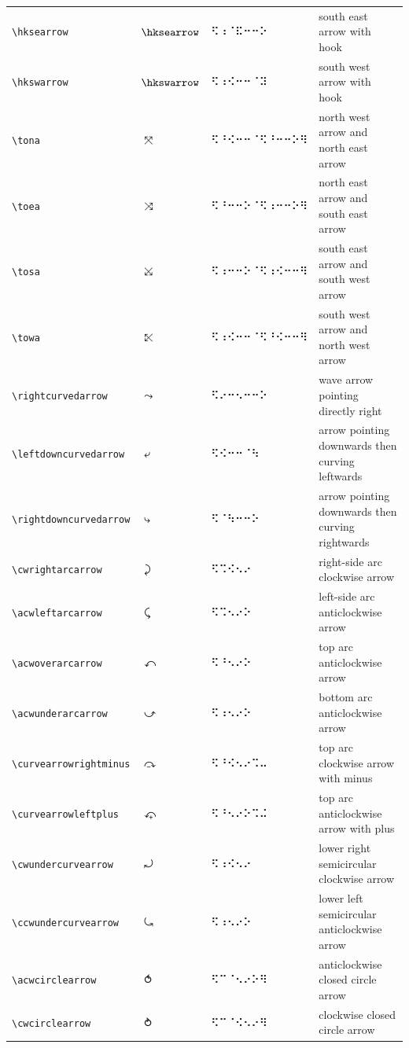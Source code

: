 \documentclass[oneside]{article}
\begin{document}
\begin{longtable}{llll}
\verb|\hksearrow| & $\hksearrow$ &   ⠫⠰⠈⠯⠒⠒⠕   & {south east arrow with hook} \\[2ex]
\verb|\hkswarrow| & $\hkswarrow$ &   ⠫⠰⠪⠒⠒⠈⠽   & {south west arrow with hook} \\[2ex]
\verb|\tona| & $\tona$ &   ⠫⠘⠪⠒⠒⠈⠫⠘⠒⠒⠕⠻   & {north west arrow and north east arrow} \\[2ex]
\verb|\toea| & $\toea$ &   ⠫⠘⠒⠒⠕⠈⠫⠰⠒⠒⠕⠻   & {north east arrow and south east arrow} \\[2ex]
\verb|\tosa| & $\tosa$ &   ⠫⠰⠒⠒⠕⠈⠫⠰⠪⠒⠒⠻   & {south east arrow and south west arrow} \\[2ex]
\verb|\towa| & $\towa$ &   ⠫⠰⠪⠒⠒⠈⠫⠘⠪⠒⠒⠻   & {south west arrow and north west arrow} \\[2ex]
\verb|\rightcurvedarrow| & $\rightcurvedarrow$ &   ⠫⠔⠒⠢⠒⠒⠕   & {wave arrow pointing directly right} \\[2ex]
\verb|\leftdowncurvedarrow| & $\leftdowncurvedarrow$ &   ⠫⠪⠒⠒⠈⠳   & {arrow pointing downwards then curving leftwards} \\[2ex]
\verb|\rightdowncurvedarrow| & $\rightdowncurvedarrow$ &   ⠫⠈⠳⠒⠒⠕   & {arrow pointing downwards then curving rightwards} \\[2ex]
\verb|\cwrightarcarrow| & $\cwrightarcarrow$ &   ⠫⠩⠪⠢⠔   & {right-side arc clockwise arrow} \\[2ex]
\verb|\acwleftarcarrow| & $\acwleftarcarrow$ &   ⠫⠩⠢⠔⠕   & {left-side arc anticlockwise arrow} \\[2ex]
\verb|\acwoverarcarrow| & $\acwoverarcarrow$ &   ⠫⠘⠢⠔⠕   & {top arc anticlockwise arrow} \\[2ex]
\verb|\acwunderarcarrow| & $\acwunderarcarrow$ &   ⠫⠰⠢⠔⠕   & {bottom arc anticlockwise arrow} \\[2ex]
\verb|\curvearrowrightminus| & $\curvearrowrightminus$ &   ⠫⠘⠪⠢⠔⠩⠤   & {top arc clockwise arrow with minus} \\[2ex]
\verb|\curvearrowleftplus| & $\curvearrowleftplus$ &   ⠫⠘⠢⠔⠕⠩⠬   & {top arc anticlockwise arrow with plus} \\[2ex]
\verb|\cwundercurvearrow| & $\cwundercurvearrow$ &   ⠫⠰⠪⠢⠔   & {lower right semicircular clockwise arrow} \\[2ex]
\verb|\ccwundercurvearrow| & $\ccwundercurvearrow$ &   ⠫⠰⠢⠔⠕   & {lower left semicircular anticlockwise arrow} \\[2ex]
\verb|\acwcirclearrow| & $\acwcirclearrow$ &   ⠫⠉⠈⠢⠔⠕⠻   & {anticlockwise closed circle arrow} \\[2ex]
\verb|\cwcirclearrow| & $\cwcirclearrow$ &   ⠫⠉⠈⠪⠢⠔⠻   & {clockwise closed circle arrow} \\[2ex]

\end{longtable}
\end{document}
